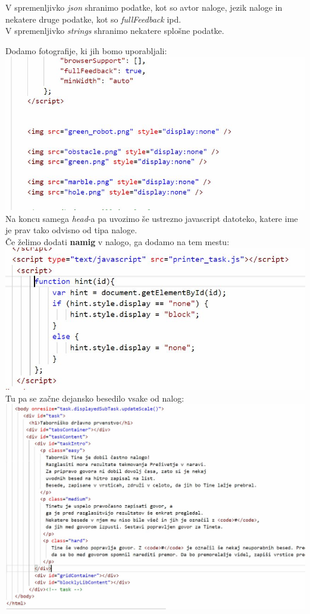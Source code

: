 \documentclass[11pt]{article} %
\begin{document}
V spremenljivko \textit{json} shranimo podatke, kot so avtor naloge, jezik naloge in nekatere druge podatke, kot so \textit{fullFeedback} ipd. \\
V spremenljivko \textit{strings} shranimo nekatere splošne podatke.

Dodamo fotografije, ki jih bomo uporabljali:\\
\includegraphics[scale=0.6]{index_foto_uvoz}\\
Na koncu samega \textit{head}-a pa uvozimo še ustrezno javascript datoteko, katere ime je prav tako odvisno od tipa naloge. \\

Če želimo dodati \textbf{namig} v nalogo, ga dodamo na tem mestu: \\

\includegraphics[scale=0.6]{index_splosno_hint_task}\\


Tu pa se začne dejansko besedilo vsake od nalog: \\

\includegraphics[scale=0.6]{index_splosno_body}\\
\end{document}
